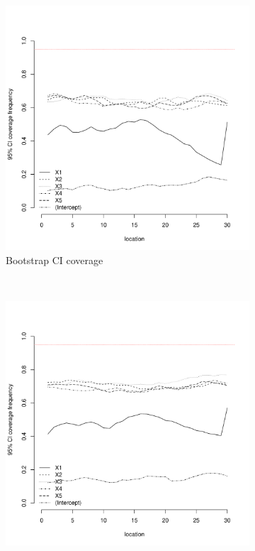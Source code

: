 \documentclass[authoryear, review, 11pt]{elsarticle}
\begin{document}
\begin{figure}
	\vspace{-30mm}
	\centering
	\begin{subfigure}[b]{0.45\textwidth}
	\centering
		\includegraphics[width=\textwidth]{../../figures/simulation/15.12.profile_bootstrap_coverage.pdf}
		\caption{Bootstrap CI coverage}
	\end{subfigure}%
	~ %
	\begin{subfigure}[b]{0.45\textwidth}
	\centering
		\includegraphics[width=\textwidth]{../../figures/simulation/15.12.profile_se_coverage.pdf}

\end{subfigure}
\end{figure}
\end{document}
